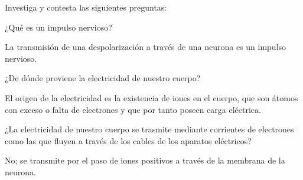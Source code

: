 Investiga y contesta las siguientes preguntas:

\begin{parts}
    ¿Qué es un impulso nervioso?

    \begin{solutionbox}{1.5cm}
        La transmisión de una despolarización a través de una neurona es un impulso nervioso.
    \end{solutionbox}

    ¿De dónde proviene la electricidad de nuestro cuerpo?

    \begin{solutionbox}{2cm}
        El origen de la electricidad es la existencia de iones en el cuerpo, que son átomos con exceso o falta de electrones y que por tanto poseen carga eléctrica.
    \end{solutionbox}

    ¿La electricidad de nuestro cuerpo se trasmite mediante corrientes de electrones como las que fluyen a través de los cables de los aparatos eléctricos?

    \begin{solutionbox}{1.5cm}
        No; se transmite por el paso de iones positivos a través de la membrana de la neurona.
    \end{solutionbox}
\end{parts}
